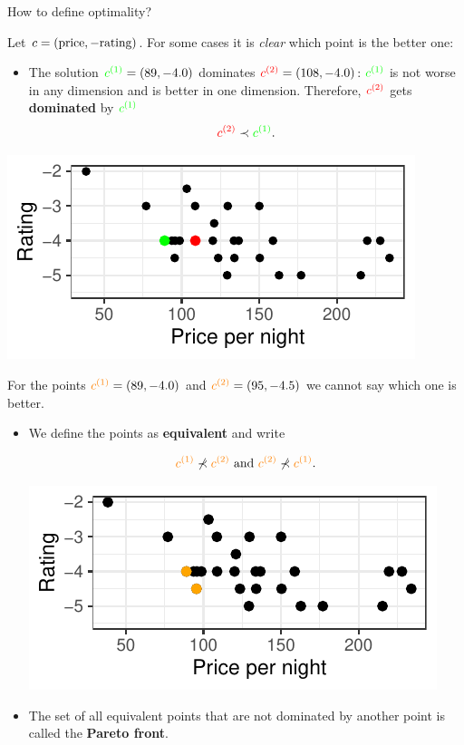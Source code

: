 \begin{frame}[allowframebreaks]{How to define optimality?}

Let $c = (\text{price}, - \text{rating})$. For some cases it is \textit{clear} which point is the better one:

\begin{itemize}
    \item The solution $\textcolor{green}{c^{(1)}} = \left(89, - 4.0\right)$ dominates $\textcolor{red}{c^{(2)}} = \left(108, - 4.0\right)$: $\textcolor{green}{c^{(1)}}$ is not worse in any dimension and is better in one dimension. Therefore, $\textcolor{red}{c^{(2)}}$ gets \textbf{dominated} by $\textcolor{green}{c^{(1)}}$
$$
\textcolor{red}{c^{(2)}} \prec \textcolor{green}{c^{(1)}}.
$$
\end{itemize}

\centering \includegraphics[width=0.5\linewidth]{images/expedia-3-1}

\framebreak

For the points $\textcolor{orange}{c^{(1)}} = \left(89, - 4.0\right)$ and $\textcolor{orange}{c^{(2)}} = \left(95, - 4.5\right)$ we cannot say which one is better.

\begin{itemize}
\item We define the points as \textbf{equivalent} and write

$$
\textcolor{orange}{c^{(1)}} \not\prec \textcolor{orange}{c^{(2)}} \text{ and } \textcolor{orange}{c^{(2)}} \not\prec \textcolor{orange}{c^{(1)}}.
$$

\centering \includegraphics[width=0.5\linewidth]{images/expedia-4-1}


\item The set of all equivalent points that are not dominated by another point is called the \textbf{Pareto front}.


\end{itemize}
\end{frame}
